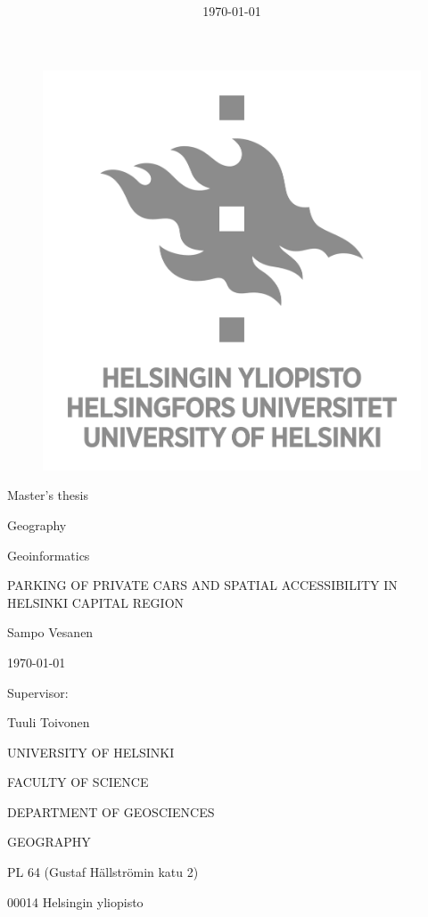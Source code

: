 \documentclass[a4paper,11pt]{article}
\date{\today}
\title{ \mytitle}
\author{ \myname}
\newcommand{\myname}{                      %
    Sampo Vesanen
}
\newcommand{\mytitle}{                      %
    Parking of private cars and spatial accessibility in Helsinki Capital Region
}
\begin{document}
\begin{titlepage}{
    \centering
    \begin{figure}[t]
    \centering
    \includegraphics[scale=0.4]{HY_logo}
    \end{figure}
    
    Master's thesis \par
    Geography \par
    Geoinformatics \par
    
    \bigskip
    \MakeUppercase{\mytitle}
    
    \bigskip
    \myname
    
    \mydate\today
    
    \vfill
    
    Supervisor: \par
    Tuuli Toivonen \par
    \bigskip
    \bigskip
    UNIVERSITY OF HELSINKI\par
    FACULTY OF SCIENCE\par
    DEPARTMENT OF GEOSCIENCES\par
    GEOGRAPHY\par
    PL 64 (Gustaf Hällströmin katu 2)\par
    00014 Helsingin yliopisto\par
}
\end{titlepage}
\end{document}

